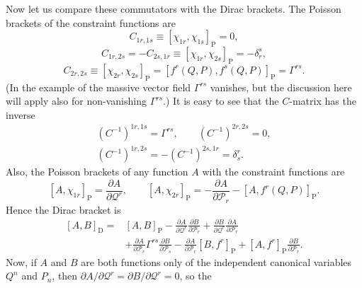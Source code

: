 Now let us compare these commutators with the Dirac brackets. The Poisson
brackets of the constraint functions are
\begin{equation}
  C_{1r,1s}\equiv[\chi_{1r},\chi_{1s}]_{\mathrm P}=0,
  \tag{7.A.8}\label{eq:7.A.8}
\end{equation}
\begin{equation}
  C_{1r,2s}=-C_{2s,1r}\equiv[\chi_{1r},\chi_{2s}]_{\mathrm P}
  =-\delta^s_r,
  \tag{7.A.9}\label{eq:7.A.9}
\end{equation}
\begin{equation}
  C_{2r,2s}\equiv[\chi_{2r},\chi_{2s}]_{\mathrm P}
  =[f^r(Q,P),f^s(Q,P)]_{\mathrm P}=\Gamma^{rs}.
  \tag{7.A.10}\label{eq:7.A.10}
\end{equation}
(In the example of the massive vector field $\Gamma^{rs}$ vanishes, but the
discussion here will apply also for non-vanishing $\Gamma^{rs}$.) It is easy
to see that the $C$-matrix has the inverse
\begin{equation}
  \begin{gathered}
    (C^{-1})^{1r,1s}=\Gamma^{rs},\qquad
    (C^{-1})^{2r,2s}=0,\\
    (C^{-1})^{1r,2s}=-(C^{-1})^{2s,1r}=\delta^r_s.
  \end{gathered}
  \tag{7.A.11}\label{eq:7.A.11}
\end{equation}
Also, the Poisson brackets of any function $A$ with the constraint functions
are
\[
  [A,\chi_{1r}]_{\mathrm P}=\frac{\partial A}{\partial\mathcal{Q}^r},
  \qquad
  [A,\chi_{2r}]_{\mathrm P}
  =-\frac{\partial A}{\partial\mathcal{P}_r}-[A,f^r(Q,P)]_{\mathrm P}.
\]
Hence the Dirac bracket is
\begin{equation}
  \begin{aligned}
    [A,B]_{\mathrm D}={}&[A,B]_{\mathrm P}
    -\frac{\partial A}{\partial\mathcal{Q}^r}
      \frac{\partial B}{\partial\mathcal{P}_r}
    +\frac{\partial B}{\partial\mathcal{Q}^r}
      \frac{\partial A}{\partial\mathcal{P}_r}\\
    &+\frac{\partial A}{\partial\mathcal{P}_r}\Gamma^{rs}
      \frac{\partial B}{\partial\mathcal{P}_s}
    -\frac{\partial A}{\partial\mathcal{P}_r}[B,f^r]_{\mathrm P}
    +[A,f^r]_{\mathrm P}\frac{\partial B}{\partial\mathcal{P}_r}.
  \end{aligned}
  \tag{7.A.12}\label{eq:7.A.12}
\end{equation}
Now, if $A$ and $B$ are both functions only of the independent canonical
variables $Q^n$ and $P_n$, then
$\partial A/\partial\mathcal{Q}^r=\partial B/\partial\mathcal{Q}^r=0$, so the
